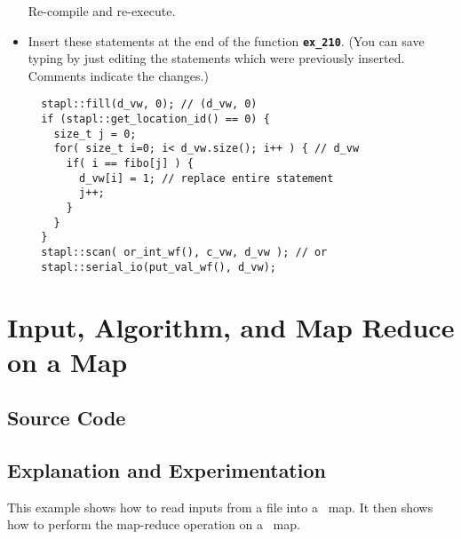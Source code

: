 \documentclass{report}
\begin{document}
\begin{itemize}
Re-compile and re-execute.
\item
Insert these statements at the end of the function
\texttt{{\bf ex\_210}}.
(You can save typing by just editing the statements which were previously
inserted.  Comments indicate the changes.)
\begin{verbatim}
  stapl::fill(d_vw, 0); // (d_vw, 0)
  if (stapl::get_location_id() == 0) {
    size_t j = 0;
    for( size_t i=0; i< d_vw.size(); i++ ) { // d_vw
      if( i == fibo[j] ) {
        d_vw[i] = 1; // replace entire statement
        j++;
      }
    }
  }
  stapl::scan( or_int_wf(), c_vw, d_vw ); // or
  stapl::serial_io(put_val_wf(), d_vw);
\end{verbatim}
\end{itemize}


\pagebreak
\section{Input, Algorithm, and Map Reduce on a Map}

\subsection{Source Code}



\subsection{Explanation and Experimentation}

This example shows how to read inputs from a file into a \stapl\ map.
It then shows how to perform the map-reduce operation on a \stapl\ map.
\end{document}
